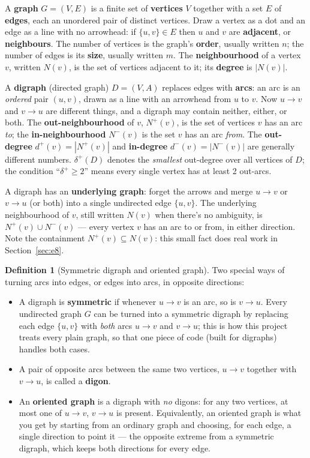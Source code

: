 \documentclass[11pt]{article}
\theoremstyle{plain}
\theoremstyle{definition}
\newtheorem{definition}[theorem]{Definition}
\theoremstyle{remark}
\begin{document}
A \textbf{graph} $G = (V, E)$ is a finite set of \textbf{vertices} $V$ together with a
set $E$ of \textbf{edges}, each an unordered pair of distinct vertices. Draw a vertex
as a dot and an edge as a line with no arrowhead: if $\{u,v\} \in E$ then $u$ and $v$
are \textbf{adjacent}, or \textbf{neighbours}. The number of vertices is the graph's
\textbf{order}, usually written $n$; the number of edges is its \textbf{size}, usually
written $m$. The \textbf{neighbourhood} of a vertex $v$, written $N(v)$, is the set of
vertices adjacent to it; its \textbf{degree} is $|N(v)|$.

A \textbf{digraph} (directed graph) $D = (V, A)$ replaces edges with \textbf{arcs}: an
arc is an \emph{ordered} pair $(u,v)$, drawn as a line with an arrowhead from $u$ to
$v$. Now $u \to v$ and $v \to u$ are different things, and a digraph may contain
neither, either, or both. The \textbf{out-neighbourhood} of $v$, $N^+(v)$, is the set
of vertices $v$ has an arc \emph{to}; the \textbf{in-neighbourhood} $N^-(v)$ is the set
$v$ has an arc \emph{from}. The \textbf{out-degree} $d^+(v) = |N^+(v)|$ and
\textbf{in-degree} $d^-(v) = |N^-(v)|$ are generally different numbers.
$\delta^+(D)$ denotes the \emph{smallest} out-degree over all vertices of $D$; the
condition ``$\delta^+ \ge 2$'' means every single vertex has at least 2 out-arcs.

A digraph has an \textbf{underlying graph}: forget the arrows and merge $u\to v$ or
$v \to u$ (or both) into a single undirected edge $\{u,v\}$. The underlying
neighbourhood of $v$, still written $N(v)$ when there's no ambiguity, is
$N^+(v) \cup N^-(v)$ — every vertex $v$ has an arc to or from, in either direction.
Note the containment $N^+(v) \subseteq N(v)$: this small fact does real work in
Section~\ref{sec:e8}.

\begin{definition}[Symmetric digraph and oriented graph]
Two special ways of turning arcs into edges, or edges into arcs, in opposite
directions:
\begin{itemize}[nosep]
\item A digraph is \textbf{symmetric} if whenever $u \to v$ is an arc, so is
$v \to u$. Every undirected graph $G$ can be turned into a symmetric digraph by
replacing each edge $\{u,v\}$ with \emph{both} arcs $u\to v$ and $v \to u$; this is how
this project treats every plain graph, so that one piece of code (built for digraphs)
handles both cases.
\item A pair of opposite arcs between the same two vertices, $u\to v$ together with
$v \to u$, is called a \textbf{digon}.
\item An \textbf{oriented graph} is a digraph with \emph{no} digons: for any two
vertices, at most one of $u \to v$, $v \to u$ is present. Equivalently, an oriented
graph is what you get by starting from an ordinary graph and choosing, for each edge,
a single direction to point it — the opposite extreme from a symmetric digraph, which
keeps both directions for every edge.
\end{itemize}
\end{definition}
\end{document}

